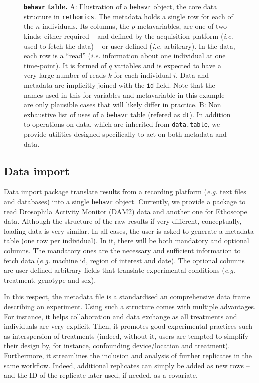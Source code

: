 \documentclass[10pt,letterpaper]{article}\usepackage[]{graphicx}\usepackage[]{color}
\begin{document}
\begin{figure}[!h]
	\caption{{\bf \texttt{behavr} table.}
	A: Illustration of a \texttt{behavr} object, the core data structure in \texttt{rethomics}.
		The metadata holds a single row for each of the $n$ individuals. 
		Its columns, the $p$ metavariables, are one of two kinds: either required -- and defined by the acquisition platform (\emph{i.e.} used to fetch the data) -- or user-defined (\emph{i.e.} arbitrary).
		In the data, each row is a ``read'' (\emph{i.e.} information about one individual at one time-point).
		It is formed of $q$ variables and is expected to have a very large number of reads $k$ for each individual $i$.
		Data and metadata are implicitly joined with the \texttt{id} field.
		Note that the names used in this for variables and metavariable in this example are only plausible cases that will likely differ in practice. 
		B: Non exhaustive list of uses of a \texttt{behavr} table (refered as \texttt{dt}). 
		In addition to operations on data, which are inherited from \texttt{data.table},
		we provide utilities designed specifically to act on both metadata and data.  
	}
	\label{fig:fig-2}
\end{figure}

\subsection*{Data import}
Data import package translate results from a recording platform (\emph{e.g.} text files and databases) into a single \texttt{behavr} object.
Currently, we provide a package to read Drosophila Activity Monitor (DAM2) data and another one for Ethoscope data.
Although the structure of the raw results if very different, conceptually, loading data is very similar.
In all cases, the user is asked to generate a metadata table (one row per individual). 
In it, there will be both mandatory and optional columns.
The mandatory ones are the necessary and sufficient information to fetch data (\emph{e.g.} machine id, region of interest and date). 
The optional columns are user-defined arbitrary fields that translate experimental conditions (\emph{e.g.} treatment, genotype and sex).

In this respect, the metadata file is a standardised an comprehensive data frame describing an experiment.
Using such a structure comes with multiple advantages.
For instance, it helps collaboration and data exchange as all treatments and individuals are very explicit.
Then, it promotes good experimental practices such as interspersion of treatments (indeed, without it, users are tempted to simplify their design by, for instance, confounding device/location and treatment).
Furthermore, it streamlines the inclusion and analysis of further replicates in the same workflow.
Indeed, additional replicates can simply be added as new rows -- and the ID of the replicate later used, if needed, as a covariate.	
\end{document}
